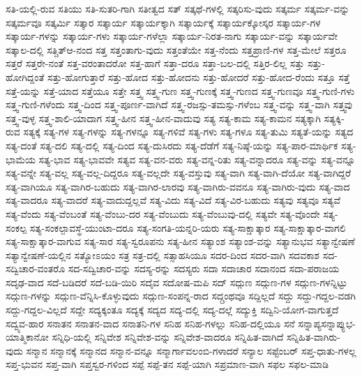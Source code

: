 {ಸತಿ-ಯಲ್ಲಿ-ರುವ
ಸತಿಯು
ಸತಿ-ಸುತರಿ-ಗಾಗಿ
ಸತೀತ್ವದ
ಸತ್
ಸತ್ಕಥೆ-ಗಳಲ್ಲಿ
ಸತ್ಕರಿಸು-ವುದು
ಸತ್ಕರ್ಮ
ಸತ್ಕರ್ಮ-ವನ್ನು
ಸತ್ಕರ್ಮವೂ
ಸತ್ಕರ್ಮಿ
ಸತ್ಕಾರ
ಸತ್ಕಾರ್ಯ
ಸತ್ಕಾರ್ಯಕ್ಕಾಗಿ
ಸತ್ಕಾರ್ಯಕ್ಕೆ
ಸತ್ಕಾರ್ಯಕ್ಕೋಸ್ಕರ
ಸತ್ಕಾರ್ಯ-ಗಳ
ಸತ್ಕಾರ್ಯ-ಗಳನ್ನು
ಸತ್ಕಾರ್ಯ-ಗಳು
ಸತ್ಕಾರ್ಯ-ಗಳೆಲ್ಲಾ
ಸತ್ಕಾರ್ಯ-ನಿರತ-ನಾಗು
ಸತ್ಕಾರ್ಯ-ವನ್ನು
ಸತ್ಕಾರ್ಯವೇ
ಸತ್ಕಾಲ-ದಲ್ಲಿ
ಸತ್ಚಿತ್ಆ-ನಂದ
ಸತ್ತ
ಸತ್ತಂತಾಗು-ವುದು
ಸತ್ತಂತೆಯೇ
ಸತ್ತ-ನೆಂದು
ಸತ್ತಪ್ರಾಣಿ-ಗಳ
ಸತ್ತ-ಮೇಲೆ
ಸತ್ತರೂ
ಸತ್ತರೆ
ಸತ್ತರೇ-ನಂತೆ
ಸತ್ತ-ವರಂತಾದರೋ
ಸತ್ತ-ಹಾಗೆ
ಸತ್ತಾ-ದರೂ
ಸತ್ತಾ-ಬಲ-ದಲ್ಲಿ
ಸತ್ತಿರ-ಲಿಲ್ಲ
ಸತ್ತು
ಸತ್ತು-ಹೋಗಿದ್ದಂತೆ
ಸತ್ತು-ಹೋಗುತ್ತಾರೆ
ಸತ್ತು-ಹೋದ
ಸತ್ತು-ಹೋದನು
ಸತ್ತು-ಹೋದರೆ
ಸತ್ತು-ಹೋದ-ರೆಂದು
ಸತ್ತೂ
ಸತ್ತೆ
ಸತ್ತೆ-ಯನ್ನು
ಸತ್ತೆ-ಯಾದ
ಸತ್ತೆಯೂ
ಸತ್ತೇ
ಸತ್ತ್ವ
ಸತ್ತ್ವ-ಗುಣ
ಸತ್ತ್ವ-ಗುಣಕ್ಕೆ
ಸತ್ತ್ವ-ಗುಣದ
ಸತ್ತ್ವ-ಗುಣವೂ
ಸತ್ತ್ವ-ಗುಣಿ-ಗಳು
ಸತ್ತ್ವ-ಗುಣಿ-ಗಳೆಂದು
ಸತ್ತ್ವ-ದಿಂದ
ಸತ್ತ್ವ-ಪೂರ್ಣ-ವಾಗಿದೆ
ಸತ್ತ್ವ-ರಜಸ್ಸು-ತಮಸ್ಸು-ಗಳೆಂಬ
ಸತ್ತ್ವ-ವನ್ನು
ಸತ್ತ್ವ-ವಾಗಿ
ಸತ್ತ್ವವು
ಸತ್ತ್ವ-ವುಳ್ಳ
ಸತ್ತ್ವ-ಶಾಲಿ-ಯಾದಾಗ
ಸತ್ತ್ವ-ಹೀನ
ಸತ್ತ್ವ-ಹೀನ-ವಾದುವು
ಸತ್ಯ
ಸತ್ಯ-ಕಾಮ
ಸತ್ಯ-ಕಾಮನ
ಸತ್ಯಕ್ಕಾಗಿ
ಸತ್ಯಕ್ಕಿ-ರುವ
ಸತ್ಯಕ್ಕೆ
ಸತ್ಯ-ಗಳ
ಸತ್ಯ-ಗಳನ್ನು
ಸತ್ಯ-ಗಳನ್ನೂ
ಸತ್ಯ-ಗಳಿವೆ
ಸತ್ಯ-ಗಳು
ಸತ್ಯ-ಗಳೂ
ಸತ್ಯ-ತುಮಿ
ಸತ್ಯತೆ-ಯನ್ನು
ಸತ್ಯದ
ಸತ್ಯ-ದಂತೆ
ಸತ್ಯ-ದಲಿ
ಸತ್ಯ-ದಲ್ಲಿ
ಸತ್ಯ-ದಿಂದ
ಸತ್ಯ-ದುಸಿರದು
ಸತ್ಯ-ದೆಡೆಗೆ
ಸತ್ಯ-ನಿಷ್ಠೆ-ಯನ್ನು
ಸತ್ಯ-ಪಾರ-ಮಾರ್ಥಿಕ
ಸತ್ಯ-ಭಾಮೆಯ
ಸತ್ಯ-ಭಾವ
ಸತ್ಯ-ಭಾವವೇ
ಸತ್ಯವ
ಸತ್ಯ-ವನ-ವರು
ಸತ್ಯ-ವನ್ನ-ರಿತು
ಸತ್ಯ-ವನ್ನಾದರೂ
ಸತ್ಯ-ವನ್ನು
ಸತ್ಯ-ವನ್ನೂ
ಸತ್ಯ-ವನ್ನೇ
ಸತ್ಯ-ವಲ್ಲ
ಸತ್ಯ-ವಲ್ಲ-ದಿದ್ದರೂ
ಸತ್ಯ-ವಲ್ಲದೇ
ಸತ್ಯ-ವಸ್ತುವು
ಸತ್ಯ-ವಾಗಿ
ಸತ್ಯ-ವಾಗಿ-ದೆಯೋ
ಸತ್ಯ-ವಾಗಿದ್ದರೆ
ಸತ್ಯ-ವಾಗಿಯೂ
ಸತ್ಯ-ವಾಗಿರ-ಬಹುದು
ಸತ್ಯ-ವಾಗಿರ-ಲಾರವು
ಸತ್ಯ-ವಾಗಿರು-ವವನೂ
ಸತ್ಯ-ವಾಗಿರು-ವುದು
ಸತ್ಯ-ವಾದ
ಸತ್ಯ-ವಾದರೂ
ಸತ್ಯ-ವಾದರೆ
ಸತ್ಯ-ವಾದುದ್ದಲ್ಲವೆ
ಸತ್ಯ-ವಿದು
ಸತ್ಯ-ವಿದೆ
ಸತ್ಯ-ವಿರ-ಬಹುದು
ಸತ್ಯವು
ಸತ್ಯವೂ
ಸತ್ಯವೆ
ಸತ್ಯ-ವೆಂದು
ಸತ್ಯ-ವೆಂಬಂತೆ
ಸತ್ಯ-ವೆಂಬು-ದರ
ಸತ್ಯ-ವೆಂಬುದು
ಸತ್ಯ-ವೆಂಬುವು-ದಲ್ಲಿ
ಸತ್ಯವೇ
ಸತ್ಯ-ವೊಂದೇ
ಸತ್ಯ-ಸಂಕಲ್ಪ
ಸತ್ಯ-ಸಂಕಲ್ಪಾವಸ್ಥೆ-ಯುಂಟಾ-ದರೂ
ಸತ್ಯ-ಸಂಗತಿ-ಯನ್ನರಿ-ಯರು
ಸತ್ಯ-ಸಾಕ್ಷಾತ್ಕಾರ
ಸತ್ಯ-ಸಾಕ್ಷಾತ್ಕಾರ-ವಾಗಲಿ
ಸತ್ಯ-ಸಾಕ್ಷಾತ್ಕಾರ-ವಾಗುವ
ಸತ್ಯ-ಸಾರ
ಸತ್ಯ-ಸ್ವರೂಪನು
ಸತ್ಯ-ಹೀನ
ಸತ್ಯಾಂಶ
ಸತ್ಯಾಂಶ-ವನ್ನು
ಸತ್ಯಾನುಭವ
ಸತ್ಯಾನ್ವೇಷಣೆ
ಸತ್ಯಾನ್ವೇಷಣೆ-ಯಲ್ಲಿನ
ಸತ್ಯೋಽಯಂ
ಸತ್ರ
ಸತ್ರ-ದಲ್ಲಿ
ಸತ್ಸಾಹಸಿಯೂ
ಸದರ-ದಿಂದ
ಸದರ-ವಾಗಿ
ಸದವಕಾಶ
ಸದ-ಸದ್ವಿಚಾರ-ವಂತರೊ
ಸದ-ಸದ್ವಿಚಾರ-ವನ್ನು
ಸದಸ್ಯ-ರನ್ನು
ಸದಸ್ಯರು
ಸದಾ
ಸದಾಚಾರ
ಸದಾನಂದ
ಸದಾ-ಪರಾಜಯ
ಸದೃಢ-ವಾದ
ಸದೆ-ಬಡಿದರೆ
ಸದೆ-ಬಡಿ-ಯಿರಿ
ಸದೈವ
ಸದೋಷ-ಮಪಿ
ಸದ್
ಸದ್ಗುಣ
ಸದ್ಗುಣ-ಗಳ
ಸದ್ಗುಣ-ಗಳನ್ನಿಟ್ಟು
ಸದ್ಗುಣ-ಗಳನ್ನು
ಸದ್ಗುಣ-ವೆನ್ನಿಸಿ-ಕೊಳ್ಳುವುದು
ಸದ್ಗುಣ-ಸಂಪನ್ನ-ರಾದ
ಸದ್ಗ್ರಂಥವೂ
ಸದ್ದಿಲ್ಲದೆ
ಸದ್ದು
ಸದ್ದು-ಗದ್ದಲ-ವಡಗಿ
ಸದ್ದು-ಗದ್ದಲ-ವಿಲ್ಲದೆ
ಸದ್ದೇ
ಸದ್ಯಕ್ಕಂತೂ
ಸದ್ಯಕ್ಕೆ
ಸದ್ಯದ
ಸದ್ಯ-ದಲ್ಲಿ
ಸದ್ಯ-ದಲ್ಲೆ
ಸದ್ಯುಕ್ತಿ
ಸದ್ವಿನಿ-ಯೋಗ-ವಾಗುತ್ತದೆ
ಸದ್ವ್ಯವ-ಹಾರ
ಸನಾತನ
ಸನಾತನ-ವಾದ
ಸನಾತನಿ-ಗಳ
ಸನಿಹ
ಸನಿಹ-ಗಳಲ್ಲು
ಸನಿಹ-ದಲ್ಲಿಯೂ
ಸನೆ
ಸನ್ನಾಪ್ಯಸನ್ನಾಪ್ಯುಭ-ಯಾತ್ಮಿಕಾನೋ
ಸನ್ನಿಧಿ-ಯಲ್ಲಿ
ಸನ್ನಿವೇಶ
ಸನ್ನಿವೇಶ-ವನ್ನು
ಸನ್ನಿವೇಶ-ವಾದರೂ
ಸನ್ನಿಹಿತ-ವಾಗಿದೆ
ಸನ್ನಿಹಿತ-ವಾಗಿರು-ವುದು
ಸನ್ಮಾನ
ಸನ್ಮಾನಕ್ಕೆ
ಸನ್ಮಾನದ
ಸನ್ಮಾನ-ವನ್ನೂ
ಸನ್ಮಾರ್ಗಾವಲಂಬಿ-ಗಳಾದರೆ
ಸನ್ಯಾಲ
ಸಪ್ಟೆಂಬರ್
ಸಪ್ತ-ಧಾತು-ಗಳಲ್ಲ
ಸಪ್ತ-ಭುವನ
ಸಪ್ತ-ವಾಗಿ
ಸಪ್ತಸ್ವರ-ಗಳಿಂದ
ಸಪ್ಪೆ
ಸಪ್ಪೆ-ತನ
ಸಪ್ಪೆ-ಯಾಗಿ
ಸಪ್ರಮಾಣ-ವಾಗಿ
ಸಫಲ
ಸಫಲ-ಮಾಡಿ
}
